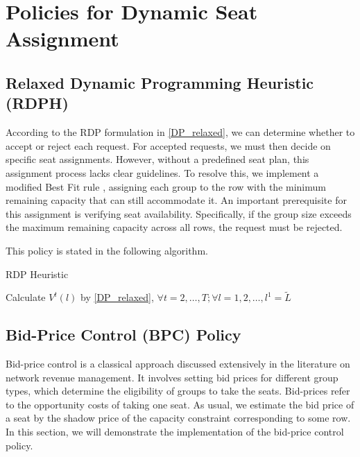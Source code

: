 \newpage

\appendix
\section{Policies for Dynamic Seat Assignment}\label{policies}

\subsection{Relaxed Dynamic Programming Heuristic (RDPH)}

According to the RDP formulation in \eqref{DP_relaxed}, we can determine whether to accept or reject each request. For accepted requests, we must then decide on specific seat assignments. However, without a predefined seat plan, this assignment process lacks clear guidelines. To resolve this, we implement a modified Best Fit rule \citep{johnson1974fast}, assigning each group to the row with the minimum remaining capacity that can still accommodate it. An important prerequisite for this assignment is verifying seat availability. Specifically, if the group size exceeds the maximum remaining capacity across all rows, the request must be rejected.

This policy is stated in the following algorithm.

\begin{algorithm}[H]
  \caption{RDP Heuristic}\label{algo_dp_heuris}
  Calculate $V^{t}(l)$ by \eqref{DP_relaxed}, $\forall t =2, \ldots, T; \forall l = 1, 2, \ldots, l^{1}=\tilde{L}$\;
\end{algorithm}

\subsection{Bid-Price Control (BPC) Policy}
Bid-price control is a classical approach discussed extensively in the literature on network revenue management. It involves setting bid prices for different group types, which determine the eligibility of groups to take the seats. Bid-prices refer to the opportunity costs of taking one seat. As usual, we estimate the bid price of a seat by the shadow price of the capacity constraint corresponding to some row. In this section, we will demonstrate the implementation of the bid-price control policy. 

